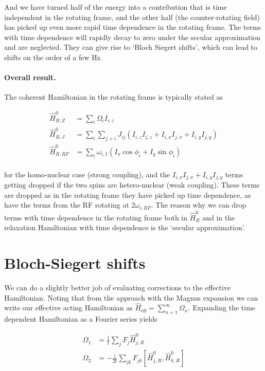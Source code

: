 \documentclass[notitlepage,11pt]{article}
\newcommand{\rmi}{\mathrm{i}}
\begin{document}
And we have turned half of the energy into a contribution that is time independent in the rotating frame, and the other half (the counter-rotating field) has picked up even more rapid time dependence in the rotating frame. The terms with time dependence will rapidly decay to zero under the secular approximation and are neglected. They can give rise to `Bloch Siegert shifts', which can lead to shifts on the order of a few Hz.

\paragraph{Overall result.} The coherent Hamiltonian in the rotating frame is typically stated as

\begin{equation}
\begin{array}{rl}
  \hat{H}^0_{R,Z} &= \sum_i \Omega_i I_{i,z}  \\
  \hat{H}^0_{R,J}  &= \sum_i \sum_{j>i} J_{ij}(I_{i,z}I_{j,z}+I_{i,x}I_{j,x}+I_{i,y}I_{j,y})  \\
  \hat{H}^0_{R,RF} &= \sum_i \omega_{i,1}\left(  I_x \cos\phi_i + I_y \sin\phi_i \right)  \\
\end{array}
\end{equation}

for the homo-nuclear case (strong coupling), and the $I_{i,x}I_{j,x}+I_{i,y}I_{j,y}$ terms getting dropped if the two spins are hetero-nuclear (weak coupling). These terms are dropped as in the rotating frame they have picked up time dependence, as have the terms from the RF rotating at $2\omega_{i,RF}$. The reason why we can drop terms with time dependence in the rotating frame both in $\hat{H}^0_R$ and in the relaxation Hamiltonian with time dependence is the `secular approximation'.




\section{Bloch-Siegert shifts}
\label{sec:bloch}
We can do a slightly better job of evaluating corrections to the effective Hamiltonian. Noting that from the approach with the Magnus expansion we can write our effective acting Hamiltonian as $\hat{H}_{\mathrm{eff}}=\sum_{n=1}^\infty \Omega_n$. Expanding the time dependent Hamiltonian as a Fourier series yields

 \begin{equation}
  \begin{array}{rl}
    \Omega_1&= \frac{1}{t}\sum_j F_{j}  \hat{H}^0_{j,R}  \\
    \Omega_2&= -\frac{\rmi }{2 t}\sum_{jk} F_{jk} [\hat{H}^0_{j,R},\hat{H}^0_{k,R}] 
\end{array}
  \end{equation}
\end{document}
